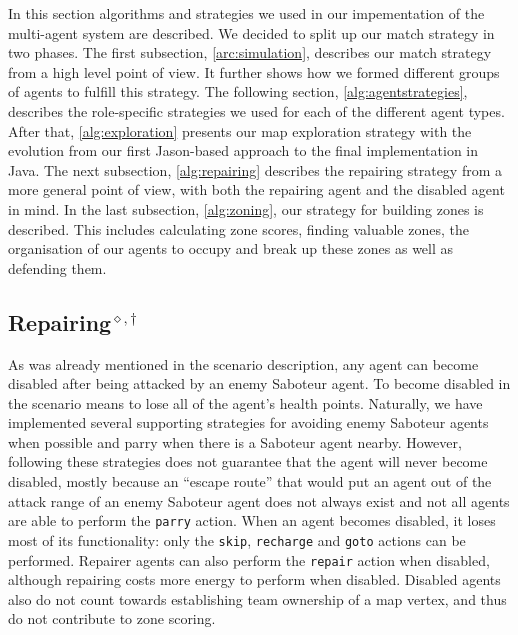 In this section algorithms and strategies we used in our impementation of the multi-agent system are described.
We decided to split up our match strategy in two phases.
The first subsection, \autoref{arc:simulation}, describes our match strategy from a high level point of view.
It further shows how we formed different groups of agents to fulfill this strategy.
The following section, \autoref{alg:agentstrategies}, describes the role-specific strategies we used for each of the different agent types.
After that, \autoref{alg:exploration} presents our map exploration strategy with the evolution from our first Jason-based approach to the final implementation in Java.
The next subsection, \autoref{alg:repairing} describes the repairing strategy from a more general point of view, with both the repairing agent and the disabled agent in mind.
In the last subsection, \autoref{alg:zoning}, our strategy for building zones is described.
This includes calculating zone scores, finding valuable zones, the organisation of our agents to occupy and break up these zones as well as defending them.





\subsection[Repairing]{Repairing$^{\diamond,\dagger}$}\label{alg:repairing}
As was already mentioned in the scenario description, any agent can become disabled after being attacked by an enemy Saboteur agent.
To become disabled in the scenario means to lose all of the agent's health points.
Naturally, we have implemented several supporting strategies for avoiding enemy Saboteur agents when possible and parry when there is a Saboteur agent nearby.
However, following these strategies does not guarantee that the agent will never become disabled, mostly because an \enquote{escape route} that would put an agent out of the attack range of an enemy Saboteur agent does not always exist and not all agents are able to perform the \texttt{parry} action.
When an agent becomes disabled, it loses most of its functionality: only the \texttt{skip}, \texttt{recharge} and \texttt{goto} actions can be performed.
Repairer agents can also perform the \texttt{repair} action when disabled, although repairing costs more energy to perform when disabled.
Disabled agents also do not count towards establishing team ownership of a map vertex, and thus do not contribute to zone scoring.

